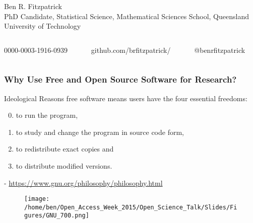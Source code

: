 \documentclass[xcolor=dvipsnames]{beamer}
\begin{document}
\begin{frame}
\begin{figure}
\begin{columns}
\end{columns}
\end{figure}

\small Ben R. Fitzpatrick\\
\tiny PhD Candidate, Statistical Science, Mathematical Sciences School, Queensland University of Technology
\newline
\begin{columns}
\begin{column}{3cm}
\tiny 0000-0003-1916-0939
\end{column}
\begin{column}{3cm}
\tiny github.com/brfitzpatrick/
\end{column}
\begin{column}{3cm}
\tiny @benrfitzpatrick
\end{column}
\end{columns}
\end{frame}

\begin{frame}
\frametitle{Why Use Free and Open Source Software for Research?}
\begin{block}{Ideological Reasons}
free software means users have the four essential freedoms: \begin{enumerate}
 \setcounter{enumi}{-1}
 \item to run the program, 
 \item to study and change the program in source code form,
 \item to redistribute exact copies and
 \item to distribute modified versions. \end{enumerate}
\begin{center} \small- \url{https://www.gnu.org/philosophy/philosophy.html}
\end{center}
\end{block}

\begin{center}
\begin{figure}
\texttt{[image: /home/ben/Open\_Access\_Week\_2015/Open\_Science\_Talk/Slides/Figures/GNU\_700.png]}
\end{figure}
\end{center}
\end{frame}
\end{document}
